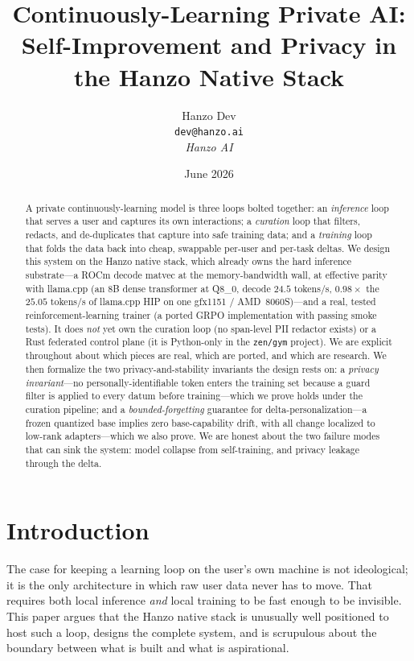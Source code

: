 \documentclass[11pt]{article}
\title{Continuously-Learning Private AI: Self-Improvement and Privacy in the Hanzo Native Stack}
\author{Hanzo Dev \\ \texttt{dev@hanzo.ai} \\ \textit{Hanzo AI}}
\date{June 2026}
\begin{document}
\hanzocoverpage

\begin{abstract}
A private continuously-learning model is three loops bolted together: an \emph{inference} loop that serves a user and captures its own interactions; a \emph{curation} loop that filters, redacts, and de-duplicates that capture into safe training data; and a \emph{training} loop that folds the data back into cheap, swappable per-user and per-task deltas. We design this system on the Hanzo native stack, which already owns the hard inference substrate---a ROCm decode matvec at the memory-bandwidth wall, at effective parity with llama.cpp (an 8B dense transformer at Q8\_0, decode $24.5$ tokens/s, $0.98\times$ the $25.05$ tokens/s of llama.cpp HIP on one gfx1151 / AMD~8060S)---and a real, tested reinforcement-learning trainer (a ported GRPO implementation with passing smoke tests). It does \emph{not} yet own the curation loop (no span-level PII redactor exists) or a Rust federated control plane (it is Python-only in the \texttt{zen/gym} project). We are explicit throughout about which pieces are real, which are ported, and which are research. We then formalize the two privacy-and-stability invariants the design rests on: a \emph{privacy invariant}---no personally-identifiable token enters the training set because a guard filter is applied to every datum before training---which we prove holds under the curation pipeline; and a \emph{bounded-forgetting} guarantee for delta-personalization---a frozen quantized base implies zero base-capability drift, with all change localized to low-rank adapters---which we also prove. We are honest about the two failure modes that can sink the system: model collapse from self-training, and privacy leakage through the delta.
\end{abstract}

\section{Introduction}

The case for keeping a learning loop on the user's own machine is not ideological; it is the only architecture in which raw user data never has to move. That requires both local inference \emph{and} local training to be fast enough to be invisible. This paper argues that the Hanzo native stack is unusually well positioned to host such a loop, designs the complete system, and is scrupulous about the boundary between what is built and what is aspirational.
\end{document}
